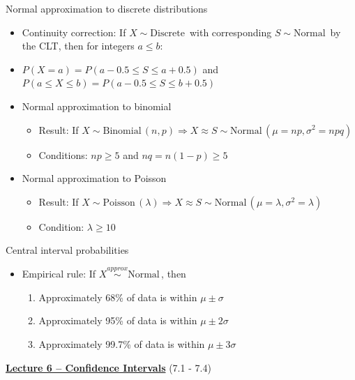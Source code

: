 \documentclass{article}
\newcommand{\bu}[1]{\textbf{\ul{#1}}}				%
\newcommand{\follow}[1]{\sim \text{#1}\,}		%
\newcommand{\followsp}[2]{\overset{#1}\sim \text{#2}\,}		%
\begin{document}
Normal approximation to discrete distributions
\begin{itemize}
    \item Continuity correction: If $X \follow{Discrete}$ with corresponding $S \follow{Normal}$ by the CLT, then for integers $a \le b$:
    \item[] $P(X = a) = P(a - 0.5 \le S \le a + 0.5)$ \hspace{20pt} and \hspace{20pt} $P(a \le X \le b) = P(a - 0.5 \le S \le b + 0.5)$
    \item Normal approximation to binomial
    \begin{itemize}
        \item Result: If $X \follow{Binomial}(n,p) \Longrightarrow X \approx S \follow{Normal}(\mu = np, \sigma^2 = npq)$
        \item Conditions: $np \ge 5$ and $nq = n(1 - p) \ge 5$
    \end{itemize}
    \item Normal approximation to Poisson
    \begin{itemize}
        \item Result: If $X \follow{Poisson}(\lambda) \Longrightarrow X \approx S \follow{Normal}(\mu = \lambda, \sigma^2 = \lambda)$
        \item Condition: $\lambda \ge 10$
    \end{itemize}
\end{itemize}

\newpage

Central interval probabilities
\begin{itemize}
    \item Empirical rule: If $X \followsp{approx}{Normal}$, then
    \begin{enumerate}
        \item Approximately 68\% of data is within $\mu \pm \sigma$
        \item Approximately 95\% of data is within $\mu \pm 2\sigma$
        \item Approximately 99.7\% of data is within $\mu \pm 3\sigma$
    \end{enumerate}
\end{itemize}\bigskip

\vspace{50pt}

{\large \bu{Lecture 6 -- Confidence Intervals}} (7.1 - 7.4)\bigskip
\end{document}
